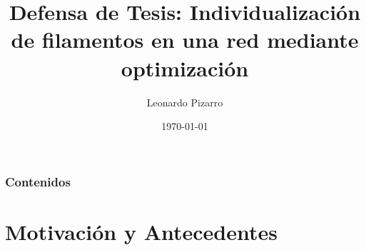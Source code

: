 \documentclass[]{beamer}
\title[Individualizaci\'on de filamentos mediante optimizaci\'on]{Defensa de Tesis: Individualizaci\'on de filamentos en una red mediante optimizaci\'on}
\author[L.\ Pizarro]{Leonardo Pizarro} %
\date{\today} %
\institute[]{Profesor Gu\'ia: Mauricio Cerda\\Profesor Co-gu\'ia: Jacques Dumais}
\begin{document}
	{
		\maketitle
	}
	\addtocounter{framenumber}{-1} %

\begin{frame}
\frametitle{Contenidos} 
\tableofcontents
\end{frame}

\section{Motivaci\'on y Antecedentes}
\end{document}
